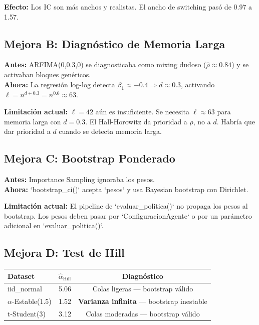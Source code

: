 \documentclass[12pt,a4paper]{article}
\begin{document}
\textbf{Efecto:} Los IC son más anchos y realistas. El ancho de switching pasó de 0.97 a 1.57.

\subsection{Mejora B: Diagnóstico de Memoria Larga}

\textbf{Antes:} ARFIMA(0,0.3,0) se diagnosticaba como mixing dudoso ($\hat{\rho} \approx 0.84$) y se activaban bloques genéricos.\\
\textbf{Ahora:} La regresión log-log detecta $\beta_1 \approx -0.4 \Rightarrow d \approx 0.3$, activando $\ell = n^{d+0.3} = n^{0.6} \approx 63$.

\textbf{Limitación actual:} $\ell=42$ aún es insuficiente. Se necesita $\ell \approx 63$ para memoria larga con $d=0.3$. El Hall-Horowitz da prioridad a $\rho$, no a $d$. Habría que dar prioridad a $d$ cuando se detecta memoria larga.

\subsection{Mejora C: Bootstrap Ponderado}

\textbf{Antes:} Importance Sampling ignoraba los pesos.\\
\textbf{Ahora:} `bootstrap_ci()` acepta `pesos` y usa Bayesian bootstrap con Dirichlet.

\textbf{Limitación actual:} El pipeline de `evaluar_politica()` no propaga los pesos al bootstrap. Los pesos deben pasar por `ConfiguracionAgente` o por un parámetro adicional en `evaluar_politica()`.

\subsection{Mejora D: Test de Hill}

\begin{longtable}{@{}lcc@{}}
	\toprule
	Dataset               & $\hat{\alpha}_{\text{Hill}}$ & Diagnóstico                                        \\
	\midrule
	\endhead
	iid\_normal           & 5.06                         & Colas ligeras --- bootstrap válido                 \\
	$\alpha$-Estable(1.5) & 1.52                         & \textbf{Varianza infinita} --- bootstrap inestable \\
	t-Student(3)          & 3.12                         & Colas moderadas --- bootstrap válido               \\
	\bottomrule
\end{longtable}
\end{document}
